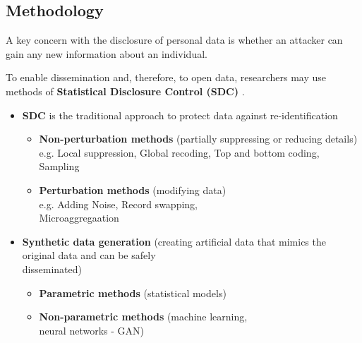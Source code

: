 \documentclass[a0,portrait]{a0poster}
\begin{document}
\begin{multicols}{3}
\section{Methodology}

A key concern with the disclosure of personal data is whether an attacker can gain any new information about an individual. 

To enable dissemination and, therefore, to open data, researchers may use methods of \textbf{Statistical Disclosure Control (SDC)} \cite{2017_Templ}. %

\begin{itemize}
    \item[\ding{228}]  \textbf{SDC} is the traditional approach to protect data against re-identification
        \begin{itemize}
            \item[\textbullet] \textbf{Non-perturbation methods} (partially suppressing or reducing details) \\
            e.g. Local suppression, %
            Global recoding, %
            Top and bottom coding, Sampling  
            \item[\textbullet] \textbf{Perturbation methods} (modifying data) \\ %
            e.g. Adding Noise, Record swapping, \\ Microaggregaation
                         
        \end{itemize}   
\end{itemize}

\begin{itemize}
     \item[\ding{228}] \textbf{Synthetic data generation} (creating artificial data that  mimics the original data and can be safely \\ disseminated)
        \begin{itemize}
            \item[\textbullet] \textbf{Parametric methods} (statistical models)
            \item[\textbullet] \textbf{Non-parametric methods} (machine learning, \\ neural networks - GAN)
        \end{itemize}        
\end{itemize}


\end{multicols}
\end{document}
